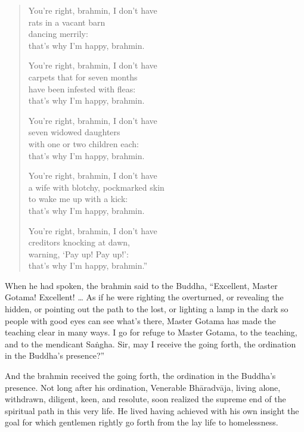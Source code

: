 \documentclass[12pt,openany]{book}%
\begin{document}
\begin{verse}
You’re right, brahmin, I don’t have \\
rats in a vacant barn \\
dancing merrily: \\
that’s why I’m happy, brahmin. 

You’re right, brahmin, I don’t have \\
carpets that for seven months \\
have been infested with fleas: \\
that’s why I’m happy, brahmin. 

You’re right, brahmin, I don’t have \\
seven widowed daughters \\
with one or two children each: \\
that’s why I’m happy, brahmin. 

You’re right, brahmin, I don’t have \\
a wife with blotchy, pockmarked skin \\
to wake me up with a kick: \\
that’s why I’m happy, brahmin. 

You’re right, brahmin, I don’t have \\
creditors knocking at dawn, \\
warning, ‘Pay up! Pay up!’: \\
that’s why I’m happy, brahmin.” 

%
\end{verse}

When he had spoken, the brahmin said to the Buddha, “Excellent, Master Gotama! Excellent! … As if he were righting the overturned, or revealing the hidden, or pointing out the path to the lost, or lighting a lamp in the dark so people with good eyes can see what’s there, Master Gotama has made the teaching clear in many ways. I go for refuge to Master Gotama, to the teaching, and to the mendicant \textsanskrit{Saṅgha}. Sir, may I receive the going forth, the ordination in the Buddha’s presence?” 

And the brahmin received the going forth, the ordination in the Buddha’s presence. Not long after his ordination, Venerable \textsanskrit{Bhāradvāja}, living alone, withdrawn, diligent, keen, and resolute, soon realized the supreme end of the spiritual path in this very life. He lived having achieved with his own insight the goal for which gentlemen rightly go forth from the lay life to homelessness. 
\end{document}
